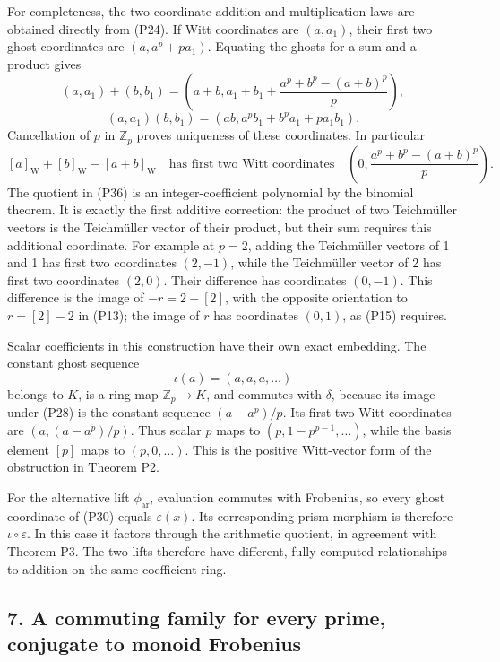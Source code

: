 \documentclass[
]{article}
\begin{document}
For completeness, the two-coordinate addition and multiplication laws
are obtained directly from (P24). If Witt coordinates are \((a,a_1)\),
their first two ghost coordinates are \((a,a^p+pa_1)\). Equating the
ghosts for a sum and a product gives \[
(a,a_1)+(b,b_1)=
\left(a+b,a_1+b_1+\frac{a^p+b^p-(a+b)^p}{p}\right),
\tag{P34}
\] \[
(a,a_1)(b,b_1)=
\left(ab,a^p b_1+b^p a_1+p a_1b_1\right).
\tag{P35}
\] Cancellation of \(p\) in \(\mathbb Z_p\) proves uniqueness of these
coordinates. In particular \[
[a]_{\mathrm W}+[b]_{\mathrm W}-[a+b]_{\mathrm W}
\quad\text{has first two Witt coordinates}\quad
\left(0,\frac{a^p+b^p-(a+b)^p}{p}\right).
\tag{P36}
\] The quotient in (P36) is an integer-coefficient polynomial by the
binomial theorem. It is exactly the first additive correction: the
product of two Teichmüller vectors is the Teichmüller vector of their
product, but their sum requires this additional coordinate. For example
at \(p=2\), adding the Teichmüller vectors of 1 and 1 has first two
coordinates \((2,-1)\), while the Teichmüller vector of 2 has first two
coordinates \((2,0)\). Their difference has coordinates \((0,-1)\). This
difference is the image of \(-r=2-[2]\), with the opposite orientation
to \(r=[2]-2\) in (P13); the image of \(r\) has coordinates \((0,1)\),
as (P15) requires.

Scalar coefficients in this construction have their own exact embedding.
The constant ghost sequence \[
\iota(a)=(a,a,a,\ldots)
\tag{P37}
\] belongs to \(K\), is a ring map \(\mathbb Z_p\to K\), and commutes
with \(\delta\), because its image under (P28) is the constant sequence
\((a-a^p)/p\). Its first two Witt coordinates are \((a,(a-a^p)/p)\).
Thus scalar \(p\) maps to \((p,1-p^{p-1},\ldots)\), while the basis
element \([p]\) maps to \((p,0,\ldots)\). This is the positive
Witt-vector form of the obstruction in Theorem P2.

For the alternative lift \(\phi_{\mathrm{ar}}\), evaluation commutes
with Frobenius, so every ghost coordinate of (P30) equals
\(\varepsilon(x)\). Its corresponding prism morphism is therefore
\(\iota\circ\varepsilon\). In this case it factors through the
arithmetic quotient, in agreement with Theorem P3. The two lifts
therefore have different, fully computed relationships to addition on
the same coefficient ring.

\subsection{7. A commuting family for every prime, conjugate to monoid
Frobenius}\label{a-commuting-family-for-every-prime-conjugate-to-monoid-frobenius}
\end{document}
